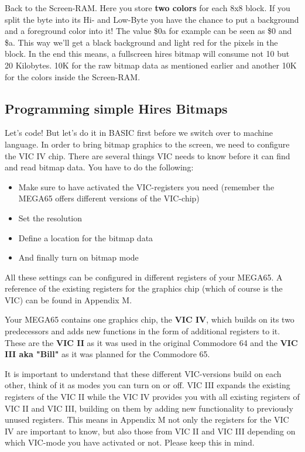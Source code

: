 Back to the Screen-RAM. Here you store \textbf{two colors} for each 8x8 block. If you split the byte into its Hi- and Low-Byte you have the chance to put a background and a foreground color into it! The value \$0a for example can be seen as \$0 and \$a. This way we'll get a black background and light red for the pixels in the block. In the end this means, a fullscreen hires bitmap will consume not 10 but 20 Kilobytes. 10K for the raw bitmap data as mentioned earlier and another 10K for the colors inside the Screen-RAM.\\

\subsection*{Programming simple Hires Bitmaps}

Let's code! But let's do it in BASIC first before we switch over to machine language. In order to bring bitmap graphics to the screen, we need to configure the VIC IV chip. There are several things VIC needs to know before it can find and read bitmap data. You have to do the following:

\begin{itemize}
	\item Make sure to have activated the VIC-registers you need (remember the MEGA65 offers different versions of the VIC-chip)
	\item Set the resolution
	\item Define a location for the bitmap data 
	\item And finally turn on bitmap mode
\end{itemize}

All these settings can be configured in different registers of your MEGA65. A reference of the existing registers for the graphics chip (which of course is the VIC) can be found in Appendix M. 

Your MEGA65 contains one graphics chip, the \textbf{VIC IV}, which builds on its two predecessors and adds new functions in the form of additional registers to it. These are the \textbf{VIC II} as it was used in the original Commodore 64 and the \textbf{VIC III aka "Bill"} as it was planned for the Commodore 65. 

It is important to understand that these different VIC-versions build on each other, think of it as modes you can turn on or off.
VIC III expands the existing registers of the VIC II while the VIC IV provides you with all existing registers of VIC II and VIC III, building on them by adding new functionality to previously unused registers. This means in Appendix M not only the registers for the VIC IV are important to know, but also those from VIC II and VIC III depending on which VIC-mode you have activated or not. Please keep this in mind.

